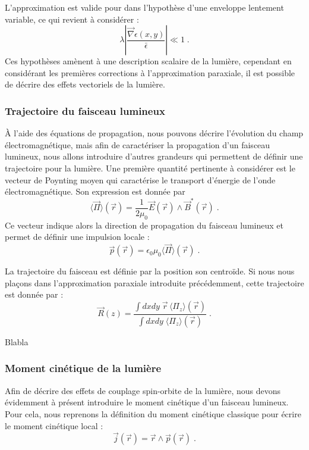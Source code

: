 \documentclass[a4paper,11pt]{article} %
\newenvironment{encart}[1]{%
	\begin{tcolorbox}
		[
		breakable, enhanced jigsaw, %
		arc = 1mm, %
		title = \textbf{#1}, %
		coltitle = white, %
		colbacktitle = blue, %
		colback = white, %
		colframe = blue %
		]
}{		
	\end{tcolorbox}
}
\begin{document}
	L'approximation est valide pour dans l'hypothèse d'une enveloppe lentement variable, ce qui revient à considérer :
	\begin{equation*}
		\lambda \left| \frac{\vec{\nabla}\epsilon(x,y)}{\bar{\epsilon}} \right| \ll 1 \; .
	\end{equation*}
	Ces hypothèses amènent à une description scalaire de la lumière, cependant en considérant les premières corrections à l'approximation paraxiale, il est possible de décrire des effets vectoriels de la lumière.
	
	
	\subsubsection{Trajectoire du faisceau lumineux}
	\`A l'aide des équations de propagation, nous pouvons décrire l'évolution du champ électromagnétique, mais afin de caractériser la propagation d'un faisceau lumineux, nous allons introduire d'autres grandeurs qui permettent de définir une trajectoire pour la lumière. Une première quantité pertinente à considérer est le vecteur de Poynting moyen qui caractérise le transport d'énergie de l'onde électromagnétique. Son expression est donnée par
	\begin{equation*}
		\langle \vec{\Pi} \rangle (\vec{r}) = \frac{1}{2 \mu_0} \vec{E}(\vec{r}) \wedge \vec{B}^*(\vec{r}) \; .
	\end{equation*}
	Ce vecteur indique alors la direction de propagation du faisceau lumineux et permet de définir une impulsion locale :
	\begin{equation*}
		\vec{p}(\vec{r}) = \epsilon_0 \mu_0 \langle \vec{\Pi} \rangle (\vec{r}) \; .
	\end{equation*}

	La trajectoire du faisceau est définie par la position son centroïde. Si nous nous plaçons dans l'approximation paraxiale introduite précédemment, cette trajectoire est donnée par :
	\begin{equation*}
		\vec{R}(z) = \frac{ \int \! dx dy \; \vec{r} \, \langle \Pi_z \rangle (\vec{r})}{\int \! dx dy \; \langle \Pi_z \rangle (\vec{r}) } \; .
	\end{equation*}

	\begin{encart}{Activité pédagogique : étude documentaire d'un mirage}
		Blabla
	\end{encart}
	
	
	\subsubsection{Moment cinétique de la lumière}
	Afin de décrire des effets de couplage spin-orbite de la lumière, nous devons évidemment à présent introduire le moment cinétique d'un faisceau lumineux. Pour cela, nous reprenons la définition du moment cinétique classique pour écrire le moment cinétique local :
	\begin{equation*}
		\vec{j}(\vec{r}) = \vec{r} \wedge \vec{p}(\vec{r}) \; .
	\end{equation*}
	
\end{document}
